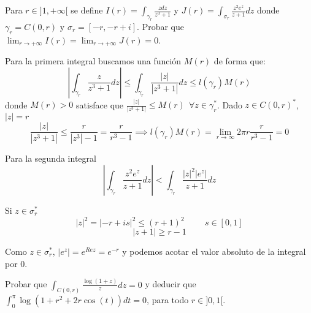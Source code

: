 \begin{ejer}
	Para $r\in]1,+\infty[$ se define $I(r) = \int_{\gamma_r} \frac{zdz}{z^3+1}$ y $J(r) = \int_{\sigma_r} \frac{z^2e^z}{z+1}dz$ donde $\gamma_r=C(0,r)$ y $\sigma_r = [-r,-r+i]$. Probar que $\lim_{r\rightarrow+\infty} I(r) = \lim_{r\rightarrow+\infty} J(r) = 0$.
\end{ejer}

\begin{sol}
	Para la primera integral buscamos una función $M(r)$ de forma que:
	$$\left| \int_{\gamma_r} \frac{z}{z^3+1}dz \right| \leq \int_{\gamma_r} \frac{|z|}{|z^3+1|} dz \leq l(\gamma_r)M(r)$$
	donde $M(r)>0$ satisface que $\frac{|z|}{|z^3+1|} \leq M(r) \ \ \forall z\in\gamma_r^{\ast}$. Dado $z\in C(0,r)^{\ast}$, $|z| = r $
	$$\frac{|z|}{|z^3+1|} \leq \frac{r}{|z^3|-1} = \frac{r}{r^3-1} \implies l(\gamma_r)M(r) = \lim_{r\rightarrow\infty} 2\pi r\frac{r}{r^3-1} = 0$$
	
	
	
	Para la segunda integral
	$$\left| \int_{\gamma_r} \frac{z^2 e^z}{z+1}dz \right| < \int_{\gamma_r} \frac{|z|^2 |e^z|}{z+1}dz$$
	
	Si $z\in\sigma_r^{\ast}$
	$$ |z|^2 = |-r+is|^2 \leq (r+1)^2 \hspace{1cm} s\in[0,1] $$
	$$ |z+1| \geq r-1 $$
	
	Como $z\in\sigma_r^{\ast}$, $|e^z| = e^{Rez} = e^{-r}$ y podemos acotar el valor absoluto de la integral por $0$.
	
\end{sol}


\begin{ejer}
	Probar que $\int_{C(0,r)} \frac{\log(1+z)}{z}dz = 0$ y deducir que $\int_0^{\pi}\log(1+r^2+2r\cos(t))dt = 0$, para todo $r\in]0,1[.$
\end{ejer}

